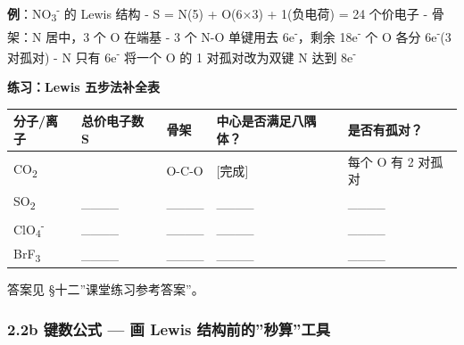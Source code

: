 \textbf{例}：NO\textsubscript{3}\textsuperscript{-} 的 Lewis 结构
- S = N(5) + O(6×3) + 1(负电荷) = 24 个价电子
- 骨架：N 居中，3 个 O 在端基
- 3 个 N-O 单键用去 6e\textsuperscript{-}，剩余 18e\textsuperscript{-}  个 O 各分 6e\textsuperscript{-}(3 对孤对)
- N 只有 6e\textsuperscript{-} \箭 将一个 O 的 1 对孤对改为双键 \箭 N 达到 8e\textsuperscript{-}

\textbf{练习：Lewis 五步法补全表}

{\def\LTcaptype{none} %
\begin{longtable}[]{@{}
  >{\centering\arraybackslash}p{}
  >{\centering\arraybackslash}p{}
  >{\raggedright\arraybackslash}p{}
  >{\centering\arraybackslash}p{}
  >{\centering\arraybackslash}p{}@{}}
\toprule\noalign{}
\begin{minipage}[b]{\linewidth}\centering
分子/离子
\end{minipage} & \begin{minipage}[b]{\linewidth}\centering
总价电子数 S
\end{minipage} & \begin{minipage}[b]{\linewidth}\raggedright
骨架
\end{minipage} & \begin{minipage}[b]{\linewidth}\centering
中心是否满足八隅体？
\end{minipage} & \begin{minipage}[b]{\linewidth}\centering
是否有孤对？
\end{minipage} \\
\midrule\noalign{}
\endhead
\bottomrule\noalign{}
\endlastfoot
CO\textsubscript{2} & 16 & O-C-O & {[}完成{]} & 每个 O 有 2 对孤对 \\
SO\textsubscript{2} & \_\_\_\_ & \_\_\_\_ & \_\_\_\_ & \_\_\_\_ \\
ClO\textsubscript{4}\textsuperscript{-} & \_\_\_\_ & \_\_\_\_ & \_\_\_\_ & \_\_\_\_ \\
BrF\textsubscript{3} & \_\_\_\_ & \_\_\_\_ & \_\_\_\_ & \_\_\_\_ \\
\end{longtable}
}

答案见 §十二''课堂练习参考答案''。

\subsubsection{2.2b 键数公式 --- 画 Lewis 结构前的''秒算''工具}\label{b-ux952eux6570ux516cux5f0f-ux753b-lewis-ux7ed3ux6784ux524dux7684ux79d2ux7b97ux5de5ux5177}

